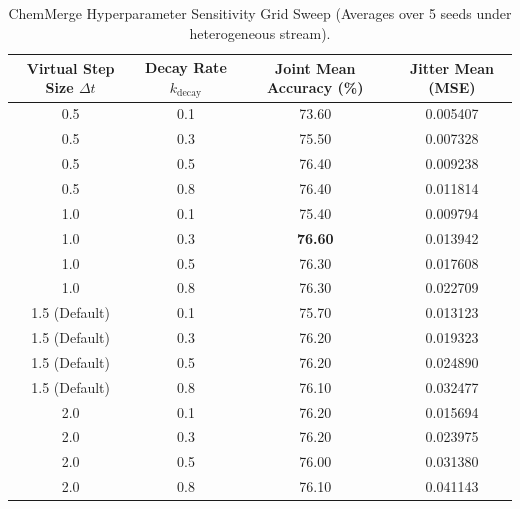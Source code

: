 \documentclass{article}
\theoremstyle{plain}
\theoremstyle{definition}
\theoremstyle{remark}
\begin{document}
\begin{table}[h]
\centering
\caption{ChemMerge Hyperparameter Sensitivity Grid Sweep (Averages over 5 seeds under heterogeneous stream).}
\label{tab:chem_grid_sweep}
\vskip 0.15in
\begin{tabular}{cccc}
\toprule
\textbf{Virtual Step Size} $\Delta t$ & \textbf{Decay Rate} $k_{\text{decay}}$ & \textbf{Joint Mean Accuracy (\%)} & \textbf{Jitter Mean (MSE)} \\
\midrule
0.5 & 0.1 & 73.60 & 0.005407 \\
0.5 & 0.3 & 75.50 & 0.007328 \\
0.5 & 0.5 & 76.40 & 0.009238 \\
0.5 & 0.8 & 76.40 & 0.011814 \\
\midrule
1.0 & 0.1 & 75.40 & 0.009794 \\
1.0 & 0.3 & \textbf{76.60} & 0.013942 \\
1.0 & 0.5 & 76.30 & 0.017608 \\
1.0 & 0.8 & 76.30 & 0.022709 \\
\midrule
1.5 (Default) & 0.1 & 75.70 & 0.013123 \\
1.5 (Default) & 0.3 & 76.20 & 0.019323 \\
1.5 (Default) & 0.5 & 76.20 & 0.024890 \\
1.5 (Default) & 0.8 & 76.10 & 0.032477 \\
\midrule
2.0 & 0.1 & 76.20 & 0.015694 \\
2.0 & 0.3 & 76.20 & 0.023975 \\
2.0 & 0.5 & 76.00 & 0.031380 \\
2.0 & 0.8 & 76.10 & 0.041143 \\
\bottomrule
\end{tabular}
\end{table}
\end{document}
